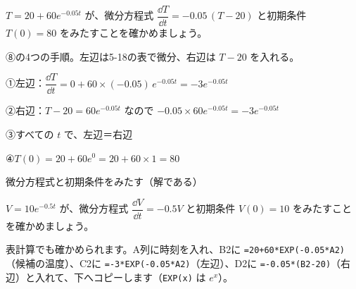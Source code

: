 \begin{reidai}[解かどうか確かめる（1階）]
$T=20+60e^{-0.05t}$ が、微分方程式 $\dfrac{\dd T}{\dd t}=-0.05\,(T-20)$ と初期条件 $T(0)=80$ をみたすことを確かめましょう。\par
\kangaekata ⑧の4つの手順。左辺は5-18の表で微分、右辺は $T-20$ を入れる。\par
\shiki ①左辺：$\dfrac{\dd T}{\dd t}=0+60\times(-0.05)\,e^{-0.05t}=-3e^{-0.05t}$\par
\hspace*{2.6\zw}②右辺：$T-20=60e^{-0.05t}$ なので $-0.05\times60e^{-0.05t}=-3e^{-0.05t}$\par
\hspace*{2.6\zw}③すべての $t$ で、左辺＝右辺\par
\hspace*{2.6\zw}④$T(0)=20+60e^{0}=20+60\times1=80$\par
\kotae 微分方程式と初期条件をみたす（解である）
\end{reidai}

\begin{jibun}
$V=10e^{-0.5t}$ が、微分方程式 $\dfrac{\dd V}{\dd t}=-0.5V$ と初期条件 $V(0)=10$ をみたすことを確かめましょう。
\end{jibun}
\noindent 表計算でも確かめられます。A列に時刻を入れ、B2に \texttt{=20+60*EXP(-0.05*A2)}（候補の温度）、C2に \texttt{=-3*EXP(-0.05*A2)}（左辺）、D2に \texttt{=-0.05*(B2-20)}（右辺）と入れて、下へコピーします（\texttt{EXP(x)} は $e^x$）。
\begin{bkcenter}
\end{bkcenter}



